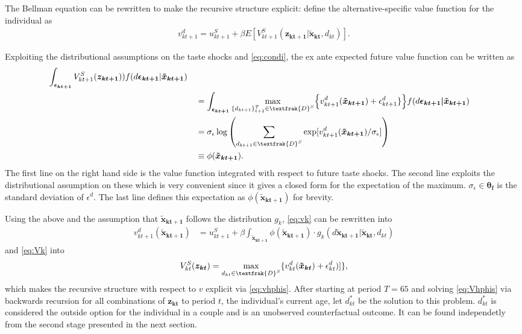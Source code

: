 The Bellman equation can be rewritten to make the recursive structure explicit: define the alternative-specific value function for the individual as
\begin{align}
v_{kt+1}^d=u_{kt+1}^S+\beta E[V_{kt+1}^S(\boldsymbol{z_{kt+1}}|\boldsymbol{\tilde{x}_{kt}},d_{kt})].
\label{eq:vk}
\end{align}

Exploiting the distributional assumptions on the taste shocks and \eqref{eq:condi}, the ex ante expected future value function can be written as
\begin{alignat*}{3}
\int_{\boldsymbol{\epsilon_{kt+1}}}{ V_{kt+1}^S(\boldsymbol{z_{kt+1}}))f(d\boldsymbol{\epsilon_{kt+1}}|\boldsymbol{\tilde{x}_{kt+1}})} \\
& &&= \int_{\boldsymbol{\epsilon_{kt+1}}}{ \max_{\{d_{kt+1}\}_{t+1}^{T}\in \textfrak{D}^S_{}} } \Big\{v_{kt+1}^{d_{}}(\boldsymbol{\tilde{x}_{kt+1}}) +\epsilon_{kt+1}^d\} \Big\}f(d\boldsymbol{\epsilon_{kt+1}|\tilde{x}_{kt+1}}) \\
& &&=\sigma_{\epsilon} \log {\left( \sum_{d_{kt+1} \in \textfrak{D}^S} { \exp[v_{kt+1}^{d_{}}(\boldsymbol{\tilde{x}_{kt+1}})/ \sigma_{\epsilon}]  } \right)} \\
& &&\equiv\phi(\boldsymbol{\tilde{x}_{kt+1}}). 
\end{alignat*}
The first line on the right hand side is the value function integrated with respect to future taste shocks. The second line exploits the distributional assumption on these which is very convenient since it gives a closed form for the expectation of the maximum. $\sigma_{\epsilon}\in\boldsymbol{\theta_f}$ is the standard deviation of $\epsilon^d.$ The last line defines this expectation as $\phi(\boldsymbol{\tilde{x}_{kt+1}})$ for brevity.

Using the above and the assumption that $\boldsymbol{\tilde{x}_{kt+1}}$ follows the distribution $g_k$, \eqref{eq:vk} can be rewritten into
\begin{align}
v_{kt+1}^d(\boldsymbol{\tilde{x}_{kt+1}})&=u_{kt+1}^S +\beta \int_{\boldsymbol{\tilde{x}_{kt+1}}}{\phi(\boldsymbol{\tilde{x}_{kt+1}})\cdot g_k(d\boldsymbol{\tilde{x}_{kt+1}}|\boldsymbol{\tilde{x}_{kt}},d_{kt})}  
\label{eq:vhphis}
\end{align}
and \eqref{eq:Vk} into
\begin{align}
V_{kt}^S(\boldsymbol{z_{kt}})=\max_{d_{kt}\in \textfrak{D}^S} \{v_{kt}^d(\boldsymbol{\tilde{x}_{kt}})+\epsilon_{kt}^d)]\},
\label{eq:Vhphis}
\end{align}
which makes the recursive structure with respect to $v$ explicit via \eqref{eq:vhphis}. After starting at period $T=65$ and solving \eqref{eq:Vhphis} via backwards recursion for all combinations of $\boldsymbol{z_{kt}}$ to period $t$, the individual's current age, let $d_{kt}^*$ be the solution to this problem. $d_{kt}^*$ is considered the outside option for the individual in a couple and is an unobserved counterfactual outcome. It can be found independetly from the second stage presented in the next section. 


